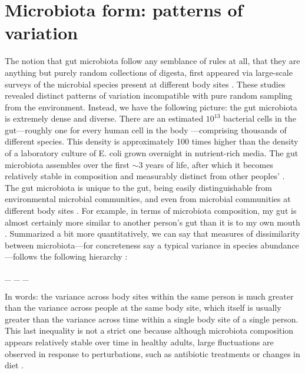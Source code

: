 \section{Microbiota form: patterns of variation}

The notion that gut microbiota follow any semblance of rules at all, that they are anything but purely random collections of digesta, first appeared via large-scale surveys of the microbial species present at different body sites \cite{the_human_microbiome_project_consortium_framework_2012}. These studies revealed distinct patterns of variation incompatible with pure random sampling from the environment. Instead, we have the following picture: the gut microbiota is extremely dense and diverse. There are an estimated $10^{13}$ bacterial cells in the gut---roughly one for every human cell in the body \cite{sender2016revised}---comprising thousands of different species. This density is approximately 100 times higher than the density of a laboratory culture of E. coli grown overnight in nutrient-rich media. The gut microbiota assembles over the first $\sim$3 years of life, after which it becomes relatively stable in composition and measurably distinct from other peoples' \cite{the_human_microbiome_project_consortium_framework_2012,yassour_natural_2016}. The gut microbiota is unique to the gut, being easily distinguishable from environmental microbial communities, and even from microbial communities at different body sites \cite{the_human_microbiome_project_consortium_framework_2012}. For example, in terms of microbiota composition, my gut is almost certainly more similar to another person's gut than it is to my own mouth \cite{the_human_microbiome_project_consortium_framework_2012}. Summarized a bit more quantitatively, we can say that measures of dissimilarity between microbiota---for concreteness say a typical variance in species abundance---follows the following hierarchy \cite{fisher2017variable}:

\be
\Var_{} \gg \Var_{} \gtrsim \Var_{}
\ee


In words: the variance across body sites within the same person is much greater than the variance across people at the same body site, which itself is usually greater than the variance across time within a single body site of a single person. This last inequality is not a strict one because although microbiota composition appears relatively stable over time in healthy adults, large fluctuations are observed in response to perturbations, such as antibiotic treatments or changes in diet \cite{dethlefsen2011incomplete,david_diet_2014,schlomann2019timescales}.

